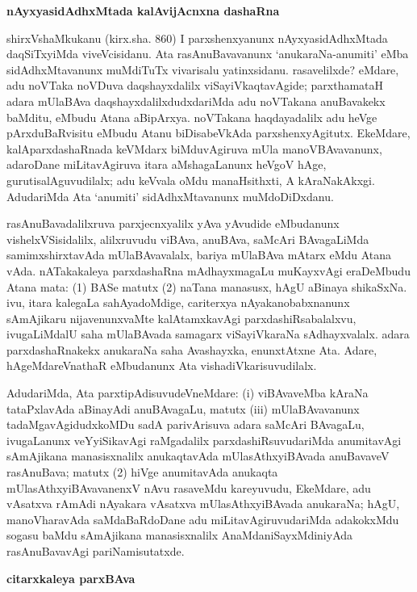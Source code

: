 \newpage

\begin{center}
{\Large\bf nAyxyasidAdhxMtada kalAvijAcnxna dashaRna}
\end{center}

shirxVshaMkukanu (kirx.sha. 860) I parxshenxyanunx nAyxyasidAdhxMtada daqSiTxyiMda viveVcisidanu. Ata rasAnuBavavanunx `anukaraNa-anumiti' eMba sidAdhxMtavanunx muMdiTuTx vivarisalu yatinxsidanu. rasavelilxde? eMdare, adu noVTaka noVDuva daqshayxdalilx viSayiVkaqtavAgide; parxthamataH adara mUlaBAva daqshayxdalilxdudxdariMda adu noVTakana anuBavakekx baMditu, eMbudu Atana aBipArxya. noVTakana haqdayadalilx adu heVge pArxduBaRvisitu eMbudu Atanu biDisabeVkAda parxshenxyAgitutx. EkeMdare, kalAparxdashaRnada keVMdarx biMduvAgiruva mUla manoVBAvavanunx, adaroDane miLitavAgiruva itara aMshagaLanunx heVgoV hAge, gurutisalAguvudilalx; adu keVvala oMdu manaHsithxti, A kAraNakAkxgi. AdudariMda Ata `anumiti' sidAdhxMtavanunx muMdoDiDxdanu.

rasAnuBavadalilxruva parxjecnxyalilx yAva yAvudide eMbudanunx vishelxVSisidalilx, alilxruvudu viBAva, anuBAva, saMcAri BAvagaLiMda samimxshirxtavAda mUlaBAvavalalx, bariya mUlaBAva mAtarx eMdu Atana vAda. nATakakaleya parxdashaRna mAdhayxmagaLu muKayxvAgi eraDeMbudu Atana mata: (1) BASe matutx (2) naTana \hbox{manasusx}, hAgU aBinaya shikaSxNa. ivu, itara kalegaLa sahAyadoMdige, cariterxya nAyakanobabx\-nanunx sAmAjikaru nijavenunxvaMte kalAtamxkavAgi parxdashiRsabalalxvu, ivugaLiMdalU saha mUlaBAvada samagarx viSayiVkaraNa sAdhayxvalalx. adara parxdashaRnakekx anukaraNa saha Avashayxka, enunxtAtxne Ata. Adare, hAgeMdareVnathaR eMbudanunx Ata vishadiVkarisu\-vudilalx.

AdudariMda, Ata parxtipAdisuvudeVneMdare: {\rm(i)} viBAvaveMba kAraNa~ tataPxlavAda aBinayAdi anuBAvagaLu, matutx {\rm(iii)} mUlaBAvavanunx tadaMga\-vAgidudxkoMDu sadA parivArisuva adara saMcAri BAvagaLu, ivugaLanunx veYyi\-SikavAgi raMgadalilx parxdashiRsuvudariMda anumitavAgi sAmAjikana manasisxnalilx anu\-kaqtavAda mUlasAthxyiBAvada anuBavaveV rasAnuBava; matutx (2) hiVge anumita\-vAda anukaqta mUlasAthxyiBAvavanenxV nAvu rasaveMdu kareyuvudu, EkeMdare, adu vAsatxva rAmAdi nAyakara vAsatxva mUlasAthxyiBAvada anukaraNa; hAgU, manoVharavAda saMdaBaRdoDane adu miLitavAgiruvudariMda adakokxMdu sogasu baMdu sAmAjikana manasisxnalilx AnaMdaniSayxMdiniyAda rasAnuBavavAgi pariNamisutatxde.

\bigskip
\begin{center}
{\Large\bf citarxkaleya parxBAva}
\end{center}

